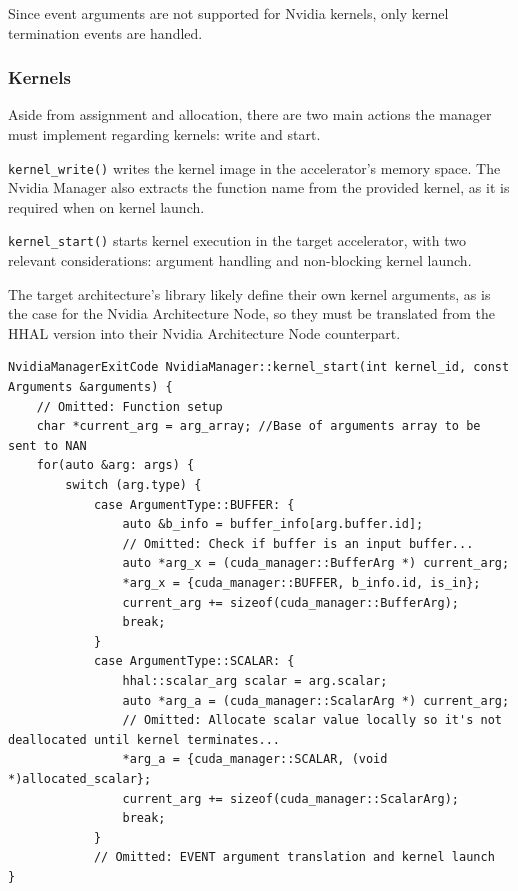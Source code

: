 Since event arguments are not supported for Nvidia kernels, only kernel termination events are handled.

\subsubsection{Kernels}

Aside from assignment and allocation, there are two main actions the manager must implement regarding kernels: write and start. 

\texttt{kernel\_write()} writes the kernel image in the accelerator's memory space. The Nvidia Manager also extracts the function name from the provided kernel, as it is required when on kernel launch.

\texttt{kernel\_start()} starts kernel execution in the target accelerator, with two relevant considerations: argument handling and non-blocking kernel launch.

The target architecture's library likely define their own kernel arguments, as is the case for the Nvidia Architecture Node, so they must be translated from the HHAL version into their Nvidia Architecture Node counterpart.

\begin{lstlisting}[style=CStyle, caption=HHAL Nvidia Manager - Kernel arguments translation]
NvidiaManagerExitCode NvidiaManager::kernel_start(int kernel_id, const Arguments &arguments) {
    // Omitted: Function setup
    char *current_arg = arg_array; //Base of arguments array to be sent to NAN
    for(auto &arg: args) {
        switch (arg.type) {
            case ArgumentType::BUFFER: {
                auto &b_info = buffer_info[arg.buffer.id];
                // Omitted: Check if buffer is an input buffer...
                auto *arg_x = (cuda_manager::BufferArg *) current_arg;
                *arg_x = {cuda_manager::BUFFER, b_info.id, is_in};
                current_arg += sizeof(cuda_manager::BufferArg);
                break;
            } 
            case ArgumentType::SCALAR: {
                hhal::scalar_arg scalar = arg.scalar;
                auto *arg_a = (cuda_manager::ScalarArg *) current_arg;
                // Omitted: Allocate scalar value locally so it's not deallocated until kernel terminates...
                *arg_a = {cuda_manager::SCALAR, (void *)allocated_scalar};
                current_arg += sizeof(cuda_manager::ScalarArg);
                break;
            }
            // Omitted: EVENT argument translation and kernel launch
}
\end{lstlisting}


